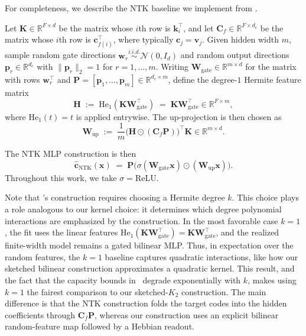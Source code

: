 For completeness, we describe the NTK baseline we implement from
\citet{nichani2024understandingfactualrecalltransformers}.

Let $\mathbf{K}\in\mathbb{R}^{F\times d}$ be the matrix whose $i$th row is $\mathbf{k}_{i}^\top$, and let
$\mathbf{C}_{f}\in\mathbb{R}^{F\times d_c}$ be the matrix whose $i$th row is $\mathbf{c}_{f(i)}^\top$,
where typically $\mathbf{c}_{j}=\mathbf{v}_{j}$. Given hidden width $m$, sample random gate directions
$\mathbf{w}_{r}\stackrel{i.i.d.}{\sim}\mathcal{N}(0,I_{d})$ and random output directions
$\mathbf{p}_{r}\in\mathbb{R}^{d_c}$ with $\|\mathbf{p}_{r}\|_{2}=1$ for $r=1,\dots,m$. Writing
$\mathbf{W}_{\mathrm{gate}}\in\mathbb{R}^{m\times d}$ for the matrix with rows $\mathbf{w}_{r}^\top$ and
$\mathbf{P}=[\mathbf{p}_{1},\dots,\mathbf{p}_{m}]\in\mathbb{R}^{d_{c}\times m}$, define the degree-$1$ Hermite feature
matrix
\[
\mathbf{H} \;:=\; \mathrm{He}_{1}(\mathbf{K}\mathbf{W}_{\mathrm{gate}}^\top)
\;=\;
\mathbf{K}\mathbf{W}_{\mathrm{gate}}^\top \in \mathbb{R}^{F\times m},
\]
where $\mathrm{He}_{1}(t)=t$ is applied entrywise. The up-projection is then chosen as
\[
\mathbf{W}_{\mathrm{up}}
\;:=\;
\frac{1}{m}\big(\mathbf{H}\odot(\mathbf{C}_f\mathbf{P})\big)^\top \mathbf{K} \in \mathbb{R}^{m\times d}.
\]

The NTK MLP construction is then
\[
\hat{\mathbf{c}}_{\mathrm{NTK}}(\mathbf{x})
\;=\;
\mathbf{P}\Big(\sigma(\mathbf{W}_{\mathrm{gate}}\mathbf{x})\odot(\mathbf{W}_{\mathrm{up}}\mathbf{x})\Big).
\]
Throughout this work, we take $\sigma=\mathrm{ReLU}$.

Note that \citet{nichani2024understandingfactualrecalltransformers}'s construction requires choosing a Hermite degree $k$.
This choice plays a role analogous to our kernel choice: it determines which degree polynomial interactions are emphasized by the construction.
In the most favorable case $k=1$, the fit uses the linear features $\mathrm{He}_{1}(\mathbf{K}\mathbf{W}_{\mathrm{gate}}^\top)=\mathbf{K}\mathbf{W}_{\mathrm{gate}}^\top$, and the realized finite-width model remains a gated bilinear MLP.
Thus, in expectation over the random features, the $k=1$ baseline captures quadratic interactions, like how our sketched bilinear construction approximates a quadratic kernel.
This result, and the fact that the capacity bounds in~\citet{nichani2024understandingfactualrecalltransformers} degrade exponentially with $k$, makes using $k=1$ the fairest comparison to our sketched-$K_{2}$ construction.
The main difference is that the NTK construction folds the target codes into the hidden coefficients through $\mathbf{C}_f\mathbf{P}$, whereas our construction uses an explicit bilinear random-feature map followed by a Hebbian readout.
